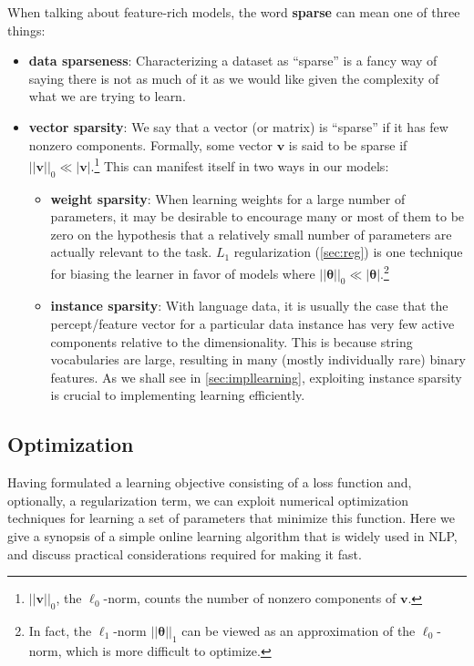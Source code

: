 \documentclass[11pt,letterpaper]{article}
\begin{document}
When talking about feature-rich models, the word \textbf{sparse} can mean one of three things:
\begin{itemize}
  \item \textbf{data sparseness}: Characterizing a dataset as ``sparse'' is a fancy way of saying there is not as much of it as we would like 
  given the complexity of what we are trying to learn.
  \item \textbf{vector sparsity}: We say that a vector (or matrix) is ``sparse'' if it has few nonzero components.
  Formally, some vector $\mathbf{v}$ is said to be sparse if $||\mathbf{v}||_0 \ll |\mathbf{v}|$.\footnote{$||\mathbf{v}||_0$, the $\ell_0$-norm, counts the number of nonzero components of $\mathbf{v}$.} 
  This can manifest itself in two ways in our models:
  \begin{itemize}
  	\item \textbf{weight sparsity}: When learning weights for a large number of parameters, it may be desirable to encourage
  many or most of them to be zero on the hypothesis that a relatively small number of parameters are actually 
  relevant to the task. 
  $L_1$ regularization (\cref{sec:reg}) is one technique for biasing the learner in favor of models where 
  $||\boldsymbol{\theta}||_0 \ll |\boldsymbol{\theta}|$.\footnote{In fact, the $\ell_1$-norm $||\boldsymbol{\theta}||_1$ can be viewed as an approximation of the $\ell_0$-norm, 
  which is more difficult to optimize.}
	  \item \textbf{instance sparsity}: With language data, it is usually the case that the percept\slash feature 
  vector for a particular data instance has very few active components relative to the dimensionality.
  This is because string vocabularies are large, resulting in many (mostly individually rare) binary features.  
  As we shall see in \cref{sec:impllearning}, exploiting instance sparsity is crucial to implementing learning efficiently.
  \end{itemize} 
\end{itemize}

\subsection{Optimization}

Having formulated a learning objective consisting of a loss function and, optionally, a regularization term, 
we can exploit numerical optimization techniques for learning a set of parameters that minimize this function.
Here we give a synopsis of a simple online learning algorithm that is widely used in NLP, 
and discuss practical considerations required for making it fast.
\end{document}
